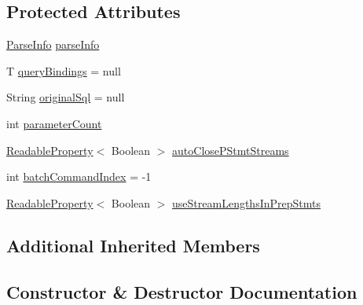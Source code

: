 \subsection*{Protected Attributes}
\begin{DoxyCompactItemize}
\item 
\mbox{\hyperlink{classcom_1_1mysql_1_1cj_1_1_parse_info}{Parse\+Info}} \mbox{\hyperlink{classcom_1_1mysql_1_1cj_1_1_abstract_prepared_query_adc622ebab9af7699a66fbbae03c910f3}{parse\+Info}}
\item 
T \mbox{\hyperlink{classcom_1_1mysql_1_1cj_1_1_abstract_prepared_query_a0d53ba1433f909085f14d0b1606faeca}{query\+Bindings}} = null
\item 
String \mbox{\hyperlink{classcom_1_1mysql_1_1cj_1_1_abstract_prepared_query_a06bb5d3e19f687e01fb4274e1f6f4f6a}{original\+Sql}} = null
\item 
int \mbox{\hyperlink{classcom_1_1mysql_1_1cj_1_1_abstract_prepared_query_a52a040d3c51f2a35b9c257edf897c6f0}{parameter\+Count}}
\item 
\mbox{\hyperlink{interfacecom_1_1mysql_1_1cj_1_1conf_1_1_readable_property}{Readable\+Property}}$<$ Boolean $>$ \mbox{\hyperlink{classcom_1_1mysql_1_1cj_1_1_abstract_prepared_query_a0c4bf92edc2656fb5a35ad26415f7a91}{auto\+Close\+P\+Stmt\+Streams}}
\item 
int \mbox{\hyperlink{classcom_1_1mysql_1_1cj_1_1_abstract_prepared_query_abf8b65895d25af2ce73ef93f141d8c44}{batch\+Command\+Index}} = -\/1
\item 
\mbox{\hyperlink{interfacecom_1_1mysql_1_1cj_1_1conf_1_1_readable_property}{Readable\+Property}}$<$ Boolean $>$ \mbox{\hyperlink{classcom_1_1mysql_1_1cj_1_1_abstract_prepared_query_adc502931c1f36d8f058dc6af52981a0b}{use\+Stream\+Lengths\+In\+Prep\+Stmts}}
\end{DoxyCompactItemize}
\subsection*{Additional Inherited Members}


\subsection{Constructor \& Destructor Documentation}
\mbox{\label{classcom_1_1mysql_1_1cj_1_1_abstract_prepared_query_ae000602ddaa23a005e2c292a68e01378}} 
